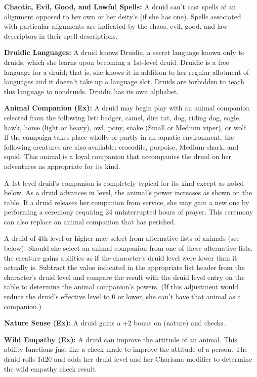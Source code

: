 \textbf{Chaotic, Evil, Good, and Lawful Spells:} A druid can't cast spells of an alignment opposed to her own or her deity's (if she has one). Spells associated with particular alignments are indicated by the chaos, evil, good, and law descriptors in their spell descriptions.

\textbf{Druidic Languages:} A druid knows Druidic, a secret language known only to druids, which she learns upon becoming a 1st-level druid. Druidic is a free language for a druid; that is, she knows it in addition to her regular allotment of languages and it doesn't take up a language slot. Druids are forbidden to teach this language to nondruids. Druidic has its own alphabet.

\textbf{Animal Companion (Ex):} A druid may begin play with an animal companion selected from the following list: badger, camel, dire rat, dog, riding dog, eagle, hawk, horse (light or heavy), owl, pony, snake (Small or Medium viper), or wolf. If the campaign takes place wholly or partly in an aquatic environment, the following creatures are also available: crocodile, porpoise, Medium shark, and squid. This animal is a loyal companion that accompanies the druid on her adventures as appropriate for its kind.

A 1st-level druid's companion is completely typical for its kind except as noted below. As a druid advances in level, the animal's power increases as shown on the table. If a druid releases her companion from service, she may gain a new one by performing a ceremony requiring 24 uninterrupted hours of prayer. This ceremony can also replace an animal companion that has perished.

A druid of 4th level or higher may select from alternative lists of animals (see below). Should she select an animal companion from one of these alternative lists, the creature gains abilities as if the character's druid level were lower than it actually is. Subtract the value indicated in the appropriate list header from the character's druid level and compare the result with the druid level entry on the table to determine the animal companion's powers. (If this adjustment would reduce the druid's effective level to 0 or lower, she can't have that animal as a companion.) 

\textbf{Nature Sense (Ex):} A druid gains a +2 bonus on  (nature) and  checks.

\textbf{Wild Empathy (Ex):} A druid can improve the attitude of an animal. This ability functions just like a  check made to improve the attitude of a person. The druid rolls 1d20 and adds her druid level and her Charisma modifier to determine the wild empathy check result.

